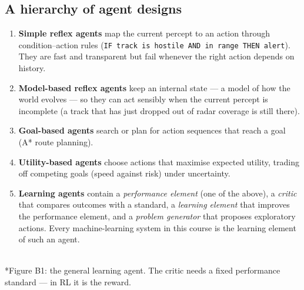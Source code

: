 \documentclass[11pt]{article}
\begin{document}
\subsection{A hierarchy of agent designs}
\begin{enumerate}
\item \textbf{Simple reflex agents} map the current percept to an action through condition--action rules (\texttt{IF track is hostile AND in range THEN alert}). They are fast and transparent but fail whenever the right action depends on history.
\item \textbf{Model-based reflex agents} keep an internal state --- a model of how the world evolves --- so they can act sensibly when the current percept is incomplete (a track that has just dropped out of radar coverage is still there).
\item \textbf{Goal-based agents} search or plan for action sequences that reach a goal (A* route planning).
\item \textbf{Utility-based agents} choose actions that maximise expected utility, trading off competing goals (speed against risk) under uncertainty.
\item \textbf{Learning agents} contain a \emph{performance element} (one of the above), a \emph{critic} that compares outcomes with a standard, a \emph{learning element} that improves the performance element, and a \emph{problem generator} that proposes exploratory actions. Every machine-learning system in this course is the learning element of such an agent.
\end{enumerate}
\begin{center}\\*{\small\color{GreyN}Figure B1: the general learning agent. The critic needs a fixed performance standard --- in RL it is the reward.}\end{center}
\end{document}
